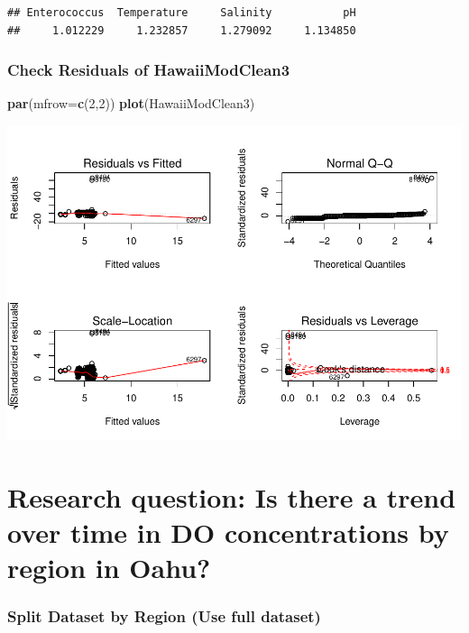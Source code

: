 \documentclass[12pt,]{article}
\newenvironment{Shaded}{\begin{snugshade}}{\end{snugshade}}
\newcommand{\KeywordTok}[1]{\textcolor[rgb]{0.13,0.29,0.53}{\textbf{#1}}}
\newcommand{\DataTypeTok}[1]{\textcolor[rgb]{0.13,0.29,0.53}{#1}}
\newcommand{\DecValTok}[1]{\textcolor[rgb]{0.00,0.00,0.81}{#1}}
\newcommand{\NormalTok}[1]{#1}
\begin{document}
\begin{verbatim}
## Enterococcus  Temperature     Salinity           pH 
##     1.012229     1.232857     1.279092     1.134850
\end{verbatim}

\subsubsection{Check Residuals of
HawaiiModClean3}\label{check-residuals-of-hawaiimodclean3}

\begin{Shaded}
\begin{Highlighting}[]
\KeywordTok{par}\NormalTok{(}\DataTypeTok{mfrow=}\KeywordTok{c}\NormalTok{(}\DecValTok{2}\NormalTok{,}\DecValTok{2}\NormalTok{))}
\KeywordTok{plot}\NormalTok{(HawaiiModClean3)}
\end{Highlighting}
\end{Shaded}

\includegraphics{Garcia_ENV872_Project_files/figure-latex/unnamed-chunk-63-1.pdf}

\section{Research question: Is there a trend over time in DO
concentrations by region in
Oahu?}\label{research-question-is-there-a-trend-over-time-in-do-concentrations-by-region-in-oahu}

\subsubsection{Split Dataset by Region (Use full
dataset)}\label{split-dataset-by-region-use-full-dataset}
\end{document}
